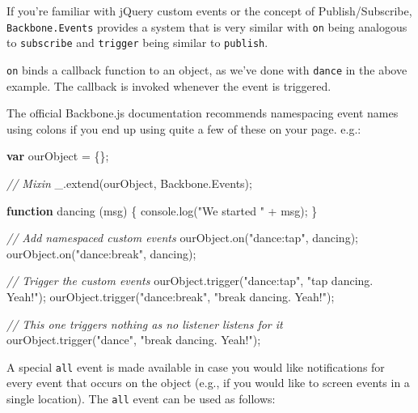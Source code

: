 \documentclass[9pt]{book}
\newenvironment{Shaded}{}{}
\newcommand{\KeywordTok}[1]{\textcolor[rgb]{0.00,0.44,0.13}{\textbf{{#1}}}}
\newcommand{\StringTok}[1]{\textcolor[rgb]{0.25,0.44,0.63}{{#1}}}
\newcommand{\CommentTok}[1]{\textcolor[rgb]{0.38,0.63,0.69}{\textit{{#1}}}}
\newcommand{\OtherTok}[1]{\textcolor[rgb]{0.00,0.44,0.13}{{#1}}}
\newcommand{\FunctionTok}[1]{\textcolor[rgb]{0.02,0.16,0.49}{{#1}}}
\newcommand{\NormalTok}[1]{{#1}}
\begin{document}
If you're familiar with jQuery custom events or the concept of
Publish/Subscribe, \texttt{Backbone.Events} provides a system that is
very similar with \texttt{on} being analogous to \texttt{subscribe} and
\texttt{trigger} being similar to \texttt{publish}.

\texttt{on} binds a callback function to an object, as we've done with
\texttt{dance} in the above example. The callback is invoked whenever
the event is triggered.

The official Backbone.js documentation recommends namespacing event
names using colons if you end up using quite a few of these on your
page. e.g.:

\begin{Shaded}
\begin{Highlighting}[]
\KeywordTok{var} \NormalTok{ourObject = \{\};}

\CommentTok{// Mixin}
\OtherTok{_}\NormalTok{.}\FunctionTok{extend}\NormalTok{(ourObject, }\OtherTok{Backbone}\NormalTok{.}\FunctionTok{Events}\NormalTok{);}

\KeywordTok{function} \FunctionTok{dancing} \NormalTok{(msg) \{ }\OtherTok{console}\NormalTok{.}\FunctionTok{log}\NormalTok{(}\StringTok{"We started "} \NormalTok{+ msg); \}}

\CommentTok{// Add namespaced custom events}
\OtherTok{ourObject}\NormalTok{.}\FunctionTok{on}\NormalTok{(}\StringTok{"dance:tap"}\NormalTok{, dancing);}
\OtherTok{ourObject}\NormalTok{.}\FunctionTok{on}\NormalTok{(}\StringTok{"dance:break"}\NormalTok{, dancing);}

\CommentTok{// Trigger the custom events}
\OtherTok{ourObject}\NormalTok{.}\FunctionTok{trigger}\NormalTok{(}\StringTok{"dance:tap"}\NormalTok{, }\StringTok{"tap dancing. Yeah!"}\NormalTok{);}
\OtherTok{ourObject}\NormalTok{.}\FunctionTok{trigger}\NormalTok{(}\StringTok{"dance:break"}\NormalTok{, }\StringTok{"break dancing. Yeah!"}\NormalTok{);}

\CommentTok{// This one triggers nothing as no listener listens for it}
\OtherTok{ourObject}\NormalTok{.}\FunctionTok{trigger}\NormalTok{(}\StringTok{"dance"}\NormalTok{, }\StringTok{"break dancing. Yeah!"}\NormalTok{);}
\end{Highlighting}
\end{Shaded}

A special \texttt{all} event is made available in case you would like
notifications for every event that occurs on the object (e.g., if you
would like to screen events in a single location). The \texttt{all}
event can be used as follows:
\end{document}
